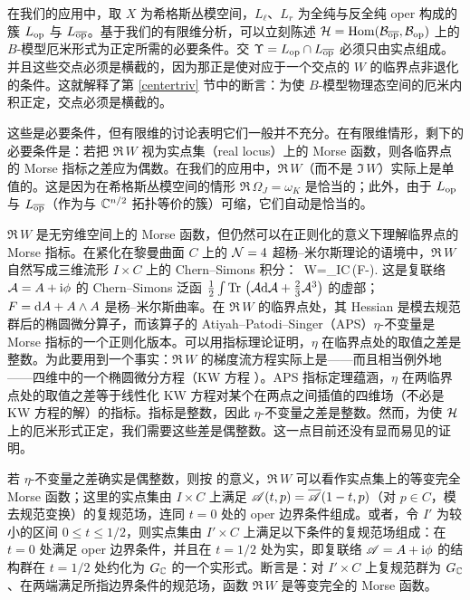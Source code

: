 在我们的应用中，取 $X$ 为希格斯丛模空间，$L_\ell$、$L_r$ 为全纯与反全纯 oper 构成的簇 $L_{\mathrm{op}}$ 与 $L_{\overline{\mathrm{op}}}$。基于我们的有限维分析，可以立刻陈述 ${\mathcal H}={\mathrm{Hom}}({\mathcal B}_{\overline{\mathrm{op}}},{\mathcal B}_{\mathrm{op}})$ 上的 $B$-模型厄米形式为正定所需的必要条件。交 $\Upsilon=L_{\mathrm{op}}\cap L_{\overline{\mathrm{op}}}$ 必须只由实点组成。并且这些交点必须是横截的，因为那正是使对应于一个交点的 $W$ 的临界点非退化的条件。这就解释了第 \ref{centertriv} 节中的断言：为使 $B$-模型物理态空间的厄米内积正定，交点必须是横截的。

这些是必要条件，但有限维的讨论表明它们一般并不充分。在有限维情形，剩下的必要条件是：若把 $\Re\,W$ 视为实点集（real locus）上的 Morse 函数，则各临界点的 Morse 指标之差应为偶数。在我们的应用中，$\Re\,W$（而不是 $\Im\,W$）实际上是单值的。这是因为在希格斯丛模空间的情形 $\Re\,\Omega_J=\omega_K$ 是恰当的；此外，由于 $L_{\mathrm{op}}$ 与 $L_{\overline{\mathrm{op}}}$（作为与 ${\mathbb C}^{n/2}$ 拓扑等价的簇）可缩，它们自动是恰当的。

$\Re\,W$ 是无穷维空间上的 Morse 函数，但仍然可以在正则化的意义下理解临界点的 Morse 指标。在紧化在黎曼曲面 $C$ 上的 ${\mathcal N}=4$ 超杨–米尔斯理论的语境中，$\Re\,W$ 自然写成三维流形 $I\times C$ 上的 Chern–Simons 积分：
\be\label{jnu} \Re\,W=\int_{I\times C}\Tr\,\left(\phi\wedge F-\phi\wedge\phi\wedge\phi\right).\ee
这是复联络 ${\mathcal A}=A+{\mathrm i}\phi$ 的 Chern–Simons 泛函 $\frac{1}{2}\int {\rm Tr}\,\left({\mathcal A}{\mathrm d}{\mathcal A} +\frac{2}{3}{\mathcal A}^3\right)$ 的虚部；$F={\mathrm d} A+A\wedge A$ 是杨–米尔斯曲率。在 $\Re\,W$ 的临界点处，其 Hessian 是模去规范群后的椭圆微分算子，而该算子的 Atiyah–Patodi–Singer（APS）$\eta$-不变量是 Morse 指标的一个正则化版本。可以用指标理论证明，$\eta$ 在临界点处的取值之差是整数。为此要用到一个事实：$\Re\,W$ 的梯度流方程实际上是——而且相当例外地——四维中的一个椭圆微分方程（KW 方程 \cite{KW}）\cite{WittenAnalytic}。APS 指标定理蕴涵，$\eta$ 在两临界点处的取值之差等于线性化 KW 方程对某个在两点之间插值的四维场（不必是 KW 方程的解）的指标。指标是整数，因此 $\eta$-不变量之差是整数。然而，为使 ${\mathcal H}$ 上的厄米形式正定，我们需要这些差是偶整数。这一点目前还没有显而易见的证明。

若 $\eta$-不变量之差确实是偶整数，则按 \cite{AB} 的意义，$\Re\,W$ 可以看作实点集上的等变完全 Morse 函数；这里的实点集由 $I\times C$ 上满足 ${\mathscr A}(t,p)=\overline{{\mathscr A}}(1-t,p)$（对 $p\in C$，模去规范变换）的复规范场，连同 $t=0$ 处的 oper 边界条件组成。或者，令 $I'$ 为较小的区间 $0\leq t\leq 1/2$，则实点集由 $I'\times C$ 上满足以下条件的复规范场组成：在 $t=0$ 处满足 oper 边界条件，并且在 $t=1/2$ 处为实，即复联络 ${\mathscr A}=A+{\mathrm i}\phi$ 的结构群在 $t=1/2$ 处约化为 $G_{\mathbb C}$ 的一个实形式。断言是：对 $I'\times C$ 上复规范群为 $G_{\mathbb C}$、在两端满足所指边界条件的规范场，函数 $\Re\,W$ 是等变完全的 Morse 函数。

